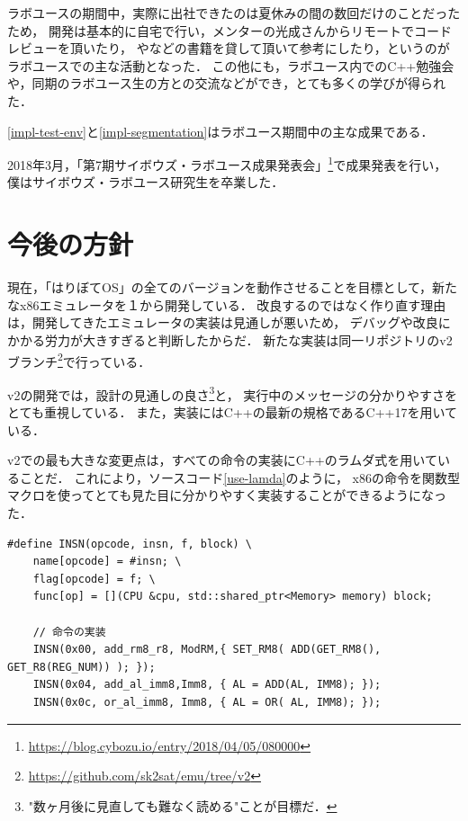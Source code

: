 \documentclass[10pt,a4j]{jsarticle}
\begin{document}
ラボユースの期間中，実際に出社できたのは夏休みの間の数回だけのことだったため，
開発は基本的に自宅で行い，メンターの光成さんからリモートでコードレビューを頂いたり，
\cite{read-486}や\cite{effective-cpp}などの書籍を貸して頂いて参考にしたり，というのがラボユースでの主な活動となった．
この他にも，ラボユース内でのC++勉強会や，同期のラボユース生の方との交流などができ，とても多くの学びが得られた．

\ref{impl-test-env}と\ref{impl-segmentation}はラボユース期間中の主な成果である．

2018年3月，「第7期サイボウズ・ラボユース成果発表会」\footnote{\url{https://blog.cybozu.io/entry/2018/04/05/080000}}で成果発表を行い，
僕はサイボウズ・ラボユース研究生を卒業した．
\vspace{-5mm}
\section{今後の方針}
\vspace{-2mm}
現在，「はりぼてOS」の全てのバージョンを動作させることを目標として，新たなx86エミュレータを１から開発している．
改良するのではなく作り直す理由は，開発してきたエミュレータの実装は見通しが悪いため，
デバッグや改良にかかる労力が大きすぎると判断したからだ．
新たな実装は同一リポジトリのv2ブランチ\footnote{\url{https://github.com/sk2sat/emu/tree/v2}}で行っている．

v2の開発では，設計の見通しの良さ\footnote{"数ヶ月後に見直しても難なく読める"ことが目標だ．}と，
実行中のメッセージの分かりやすさをとても重視している．
また，実装にはC++の最新の規格であるC++17を用いている．

v2での最も大きな変更点は，すべての命令の実装にC++のラムダ式を用いていることだ．
これにより，ソースコード\ref{use-lamda}のように，
x86の命令を関数型マクロを使ってとても見た目に分かりやすく実装することができるようになった．
\vspace{-2mm}
\begin{lstlisting}[caption=ラムダ式を使った命令の実装の一部,label=use-lamda]
#define INSN(opcode, insn, f, block) \
	name[opcode] = #insn; \
	flag[opcode] = f; \
	func[op] = [](CPU &cpu, std::shared_ptr<Memory> memory) block;

	// 命令の実装
	INSN(0x00, add_rm8_r8, ModRM,{ SET_RM8( ADD(GET_RM8(), GET_R8(REG_NUM)) ); });
	INSN(0x04, add_al_imm8,Imm8, { AL = ADD(AL, IMM8); });
	INSN(0x0c, or_al_imm8, Imm8, { AL = OR( AL, IMM8); });
\end{lstlisting}
\vspace{-4mm}
\end{document}
